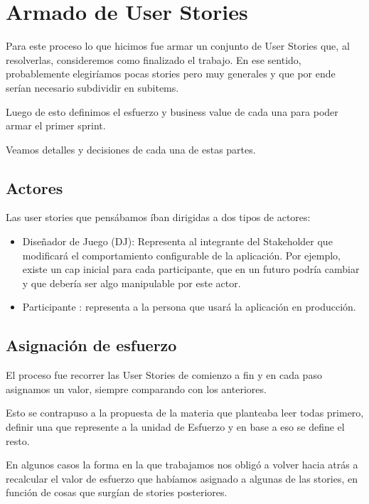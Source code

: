 \section{Armado de User Stories}

Para este proceso lo que hicimos fue armar un conjunto de User Stories que, al resolverlas, consideremos como finalizado el trabajo.
En ese sentido, probablemente elegiríamos pocas stories pero muy generales y que por ende serían necesario subdividir en subitems.

Luego de esto definimos el esfuerzo y business value de cada una para poder armar el primer sprint.

Veamos detalles y decisiones de cada una de estas partes.

\subsection{Actores}

Las user stories que pensábamos íban dirigidas a dos tipos de actores:

\begin{itemize}

\item Diseñador de Juego (DJ): Representa al integrante del Stakeholder que modificará el comportamiento configurable de la aplicación. Por ejemplo, existe un cap inicial para cada participante, que en un futuro podría cambiar y que debería ser algo manipulable por este actor.

\item Participante : representa a la persona que usará la aplicación en producción.

\end{itemize}


\subsection{Asignación de esfuerzo}

El proceso fue recorrer las User Stories de comienzo a fin y en cada paso asignamos un valor, siempre comparando con los anteriores. 

Esto se contrapuso a la propuesta de la materia que planteaba leer todas primero, definir una que represente a la unidad de Esfuerzo y en base a eso se define el resto.

En algunos casos la forma en la que trabajamos nos obligó a volver hacia atrás a recalcular el valor de esfuerzo que habíamos asignado a algunas de las stories, en función de cosas que surgían de stories posteriores.

